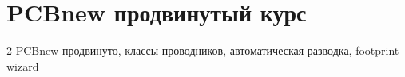 \chapter{PCBnew продвинутый курс}\label{kicad:pcbnew-adv}
2 PCBnew продвинуто, классы проводников, автоматическая разводка, footprint wizard
